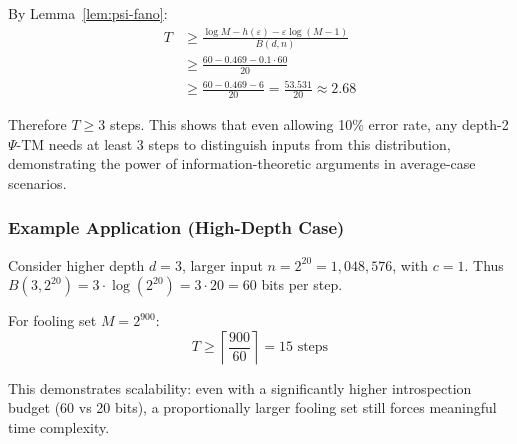 By Lemma~\ref{lem:psi-fano}:
\begin{align}
T &\geq \frac{\log M - h(\varepsilon) - \varepsilon \log(M-1)}{B(d,n)} \\
&\geq \frac{60 - 0.469 - 0.1 \cdot 60}{20} \\
&\geq \frac{60 - 0.469 - 6}{20} = \frac{53.531}{20} \approx 2.68
\end{align}

Therefore $T \geq 3$ steps. This shows that even allowing 10\% error rate, any depth-2 $\Psi$-TM needs at least 3 steps to distinguish inputs from this distribution, demonstrating the power of information-theoretic arguments in average-case scenarios.

\subsubsection{Example Application (High-Depth Case)}
Consider higher depth $d = 3$, larger input $n = 2^{20} = 1{,}048{,}576$, with $c = 1$.
Thus $B(3,2^{20}) = 3 \cdot \log(2^{20}) = 3 \cdot 20 = 60$ bits per step.

For fooling set $M = 2^{900}$:
\begin{equation}
T \geq \left\lceil \frac{900}{60} \right\rceil = 15 \text{ steps}
\end{equation}

This demonstrates scalability: even with a significantly higher introspection budget (60 vs 20 bits), a proportionally larger fooling set still forces meaningful time complexity.

